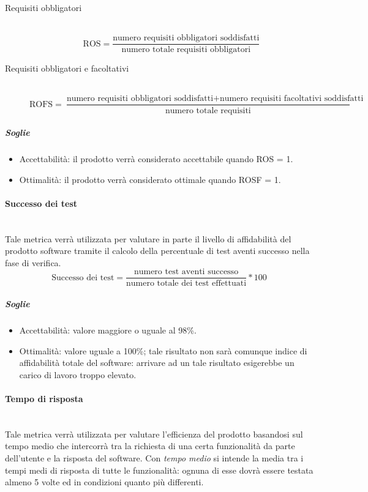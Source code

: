 \begin{description}
\item[Requisiti obbligatori]
	~\\ \begin{displaymath}
		\mbox{ROS}=\frac{\mbox{numero requisiti obbligatori soddisfatti}}{\mbox{numero totale requisiti obbligatori}}
	\end{displaymath}
	
\item[Requisiti obbligatori e facoltativi]
	~\\ \begin{displaymath}
		\mbox{ROFS}=\frac{\mbox{numero requisiti obbligatori soddisfatti} + \mbox{numero requisiti facoltativi soddisfatti}}{\mbox{numero totale requisiti}}
	\end{displaymath}
\end{description}

\subparagraph{Soglie}
\begin{itemize}
\item Accettabilità: il prodotto verrà considerato accettabile quando ROS = 1.
\item Ottimalità: il prodotto verrà considerato ottimale quando ROSF = 1.
\end{itemize}

\paragraph{Successo dei test}
	~\\Tale metrica verrà utilizzata per valutare in parte il livello di affidabilità del prodotto software tramite il calcolo della percentuale di test aventi successo nella fase di verifica.
	\begin{displaymath}
		\mbox{Successo dei test}=\frac{\mbox{numero test aventi successo}}{\mbox{numero totale dei test effettuati}} * 100
	\end{displaymath}
	
	\subparagraph{Soglie}
	\begin{itemize}
	\item Accettabilità: valore maggiore o uguale al 98\%.
	\item Ottimalità: valore uguale a 100\%; tale risultato non sarà comunque indice di affidabilità totale del software: arrivare ad un tale risultato esigerebbe un carico di lavoro troppo elevato.
	\end{itemize}
	
\paragraph{Tempo di risposta}
	~\\Tale metrica verrà utilizzata per valutare l'efficienza del prodotto basandosi sul tempo medio che intercorrà tra la richiesta di una certa funzionalità da parte dell'utente e la risposta del software. Con \textit{tempo medio} si intende la media tra i tempi medi di risposta di tutte le funzionalità: ognuna di esse dovrà essere testata almeno 5 volte ed in condizioni quanto più differenti.
	
